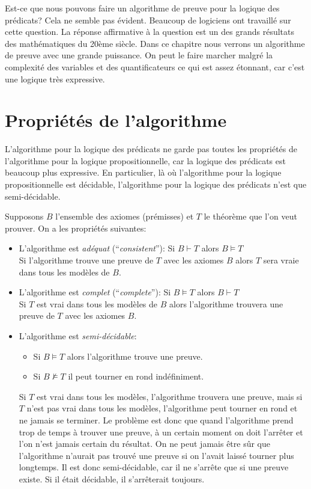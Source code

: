{Est-ce que nous pouvons faire un algorithme de preuve pour la logique des prédicats?
Cela ne semble pas évident.
Beaucoup de logiciens ont travaillé sur cette question.
La réponse affirmative à la question est un des grands résultats des mathématiques du 20ème siècle.
Dans ce chapitre nous verrons un algorithme de preuve avec une grande puissance.
On peut le faire marcher malgré la complexité des variables et des quantificateurs ce qui est assez étonnant,
car c'est une logique très expressive. 

\section{Propriétés de l'algorithme}

L'algorithme pour la logique des prédicats
ne garde pas toutes les propriétés de l'algorithme pour la logique propositionnelle,
car la logique des prédicats est beaucoup plus expressive.
En particulier, là où l'algorithme pour la logique propositionnelle est décidable,
l'algorithme pour la logique des prédicats n'est que semi-décidable.

Supposons $B$ l'ensemble des axiomes (prémisses) et $T$ le théorème que l'on veut prouver.
On a les propriétés suivantes:
\begin{itemize}
\item L'algorithme est {\em adéquat} (``{\em consistent}''): Si $B\vdash T$ alors $B \models T$\\
Si l'algorithme trouve une preuve de $T$ avec les axiomes $B$ alors $T$ sera vraie dans tous les modèles de $B$.
\item L'algorithme est {\em complet} (``{\em complete}''): Si $B \models T$ alors $B\vdash T$\\
Si $T$ est vrai dans tous les modèles de $B$ alors l'algorithme trouvera une preuve de $T$ avec les axiomes $B$.
\item L'algorithme est {\em semi-décidable}:
\begin{itemize}
\item Si $B \models T$ alors l'algorithme trouve une preuve. 
\item Si $B \not\models T$ il peut tourner en rond indéfiniment.
\end{itemize}
Si $T$ est vrai dans tous les modèles, l'algorithme trouvera une preuve, mais si $T$ n'est pas
vrai dans tous les modèles, l'algorithme peut tourner en rond et ne jamais se terminer.
Le problème est donc que quand l'algorithme prend trop de temps à trouver une preuve,
à un certain moment on doit l'arrêter et l'on n'est jamais certain du résultat.
On ne peut jamais être sûr que l'algorithme n'aurait pas trouvé une preuve si on l'avait laissé tourner plus longtemps.
Il est donc semi-décidable, car il ne s'arrête que si une preuve existe.
Si il était décidable, il s'arrêterait toujours.
\end{itemize}

}
